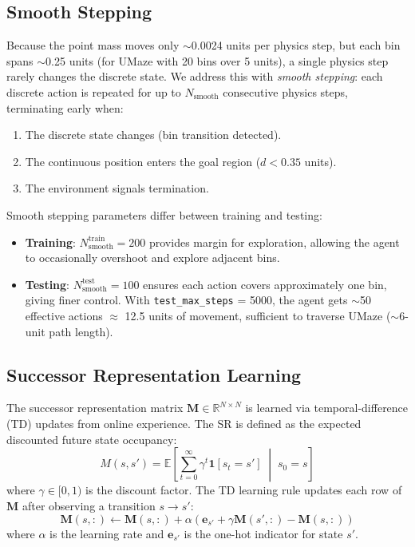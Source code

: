 \documentclass[11pt,a4paper]{article}
\newcommand{\M}{\mathbf{M}}
\newcommand{\R}{\mathbb{R}}
\begin{document}
\subsection{Smooth Stepping}
\label{sec:smooth_stepping}

Because the point mass moves only $\sim$0.0024 units per physics step, but each bin spans $\sim$0.25 units (for UMaze with 20 bins over 5 units), a single physics step rarely changes the discrete state.
We address this with \emph{smooth stepping}: each discrete action is repeated for up to $N_{\text{smooth}}$ consecutive physics steps, terminating early when:
\begin{enumerate}[noitemsep]
    \item The discrete state changes (bin transition detected).
    \item The continuous position enters the goal region ($d < 0.35$ units).
    \item The environment signals termination.
\end{enumerate}

Smooth stepping parameters differ between training and testing:
\begin{itemize}[noitemsep]
    \item \textbf{Training}: $N_{\text{smooth}}^{\text{train}} = 200$ provides margin for exploration, allowing the agent to occasionally overshoot and explore adjacent bins.
    \item \textbf{Testing}: $N_{\text{smooth}}^{\text{test}} = 100$ ensures each action covers approximately one bin, giving finer control. With \texttt{test\_max\_steps} = 5000, the agent gets $\sim$50 effective actions $\approx$ 12.5 units of movement, sufficient to traverse UMaze ($\sim$6-unit path length).
\end{itemize}

\subsection{Successor Representation Learning}
\label{sec:sr_learning}

The successor representation matrix $\M \in \R^{N \times N}$ is learned via temporal-difference (TD) updates from online experience.
The SR is defined as the expected discounted future state occupancy:
\begin{equation}
    M(s, s') = \mathbb{E}\!\left[\sum_{t=0}^{\infty} \gamma^t \mathbf{1}[s_t = s'] \;\middle|\; s_0 = s \right]
    \label{eq:sr_def}
\end{equation}
where $\gamma \in [0,1)$ is the discount factor.
The TD learning rule updates each row of $\M$ after observing a transition $s \to s'$:
\begin{equation}
    \M(s, :) \leftarrow \M(s, :) + \alpha \left( \mathbf{e}_{s'} + \gamma \M(s', :) - \M(s, :) \right)
    \label{eq:td_update}
\end{equation}
where $\alpha$ is the learning rate and $\mathbf{e}_{s'}$ is the one-hot indicator for state $s'$.
\end{document}
